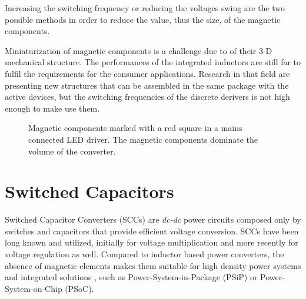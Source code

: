 Increasing the switching frequency or reducing the voltages swing are the two possible methods in order to reduce the value, thus the size, of the magnetic components.

Miniaturization of magnetic components is a challenge due to of their 3-D mechanical structure.
The performances of the integrated inductors are still far to fulfil the requirements for the consumer applications.  Research in that field are presenting new structures that can be assembled in the same package with the active devices, but the switching frequencies of the discrete derivers is not high enough to make use them.

\begin{figure}[!h]
\centering
{}
\caption{Magnetic components marked with a red square in a mains connected LED driver. The magnetic components dominate the volume of the converter.}
\label{fig:smps_driver}
\end{figure}






\section{Switched Capacitors}
Switched Capacitor Converters (SCCs) are \emph{dc-dc} power circuits composed only by switches and capacitors that provide efficient voltage conversion. SCCs have been long known and utilized, initially for voltage multiplication and more recently for voltage regulation as well. Compared to inductor based power converters, the absence of magnetic elements makes them suitable for high density power systems and integrated solutions , such as Power-System-in-Package (PSiP) or Power-System-on-Chip (PSoC).

